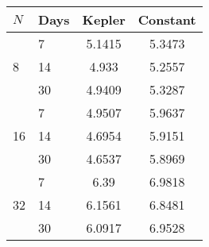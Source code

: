 \begin{tabular}{l|lcc}
\hline
$N$ & Days & Kepler & Constant \\
\hline
\multirow{3}{*}{8} & 7 & 5.1415 & 5.3473 \\ 
                   & 14 & 4.933 & 5.2557 \\ 
                   & 30 & 4.9409 & 5.3287 \\ \hline
\multirow{3}{*}{16} & 7 & 4.9507 & 5.9637 \\ 
                   & 14 & 4.6954 & 5.9151 \\ 
                   & 30 & 4.6537 & 5.8969 \\ \hline
\multirow{3}{*}{32} & 7 & 6.39 & 6.9818 \\ 
                   & 14 & 6.1561 & 6.8481 \\ 
                   & 30 & 6.0917 & 6.9528 \\\hline
\end{tabular}


